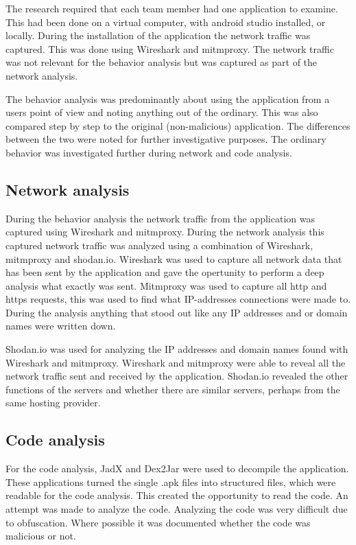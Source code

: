 The research required that each team member had one application to examine.
This had been done on a virtual computer, with android studio installed, or locally.
During the installation of the application the network traffic was captured.
This was done using Wireshark and mitmproxy.
The network traffic was not relevant for the behavior analysis but was captured as part of the network analysis.

The behavior analysis was predominantly about using the application from a users point of view and noting anything out of the ordinary.
This was also compared step by step to the original (non-malicious) application.
The differences between the two were noted for further investigative purposes.
The ordinary behavior was investigated further during network and code analysis.

\subsection{Network analysis}

During the behavior analysis the network traffic from the application was captured using Wireshark and mitmproxy.
During the network analysis this captured network traffic was analyzed using a combination of Wireshark, mitmproxy and shodan.io.
Wireshark was used to capture all network data that has been sent by the application and gave the opertunity to perform a deep analysis what exactly was sent.
Mitmproxy was used to capture all http and https requests, this was used to find what IP-addresses connections were made to.
During the analysis anything that stood out like any IP addresses and or domain names were written down.

Shodan.io was used for analyzing the IP addresses and domain names found with Wireshark and mitmproxy.
Wireshark and mitmproxy were able to reveal all the network traffic sent and received by the application.
Shodan.io revealed the other functions of the servers and whether there are similar servers, perhaps from the same hosting provider.

\subsection{Code analysis}

For the code analysis, JadX and Dex2Jar were used to decompile the application.
These applications turned the single .apk files into structured files, which were readable for the code analysis.
This created the opportunity to read the code.
An attempt was made to analyze the code.
Analyzing the code was very difficult due to obfuscation.
Where possible it was documented whether the code was malicious or not.

